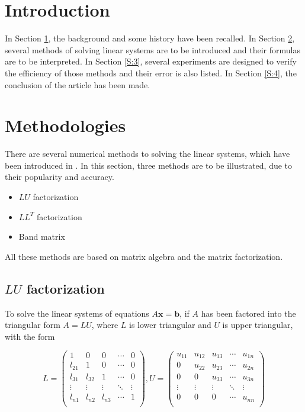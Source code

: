 \documentclass[preprint,12pt]{elsarticle}
\begin{document}

\section{Introduction}
\label{S:1}

In Section \ref{S:1}, the background and some history  have been recalled. In Section \ref{S:2}, several methods of solving linear systems are to be introduced and their formulas are to be interpreted. In Section \ref{S:3}, several experiments are designed to verify the efficiency of those methods and their error is also listed. In Section \ref{S:4}, the conclusion of the article has been made.

\section{Methodologies}
\label{S:2}

There are several numerical methods to solving the linear systems, which have been introduced in \cite{burden:2001na}. In this section, three methods are to be illustrated, due to their popularity and accuracy.

\begin{itemize}
\item $LU$ factorization
\item $LL^T$ factorization
\item Band matrix
\end{itemize}

All these methods are based on matrix algebra and the matrix factorization.

\subsection{$LU$ factorization}
\label{SS:2.1}

To solve the linear systems of equations $A\mathbf{x}=\mathbf{b}$, if $A$ has been factored into the triangular form $A = LU$, where $L$ is lower triangular and $U$ is upper triangular, with the form

\small
\[
L=\left(%
\begin{array}{ccccc}
  1& 0 & 0& \cdots & 0 \\
  l_{21} & 1 & 0 & \cdots& 0 \\
  l_{31} & l_{32} & 1 & \cdots & 0 \\
  \vdots & \vdots & \vdots &\ddots & \vdots \\
  l_{n1} & l_{n2} & l_{n3} & \cdots & 1 \\
\end{array}%
\right),
U=\left(%
\begin{array}{ccccc}
  u_{11} & u_{12} & u_{13}& \cdots & u_{1n} \\
  0 & u_{22} & u_{23} & \cdots& u_{2n} \\
  0 & 0 & u_{33} & \cdots & u_{3n} \\
  \vdots & \vdots & \vdots &\ddots & \vdots \\
  0 & 0 & 0 & \cdots & u_{nn} \\
\end{array}%
\right)
\]
\end{document}
